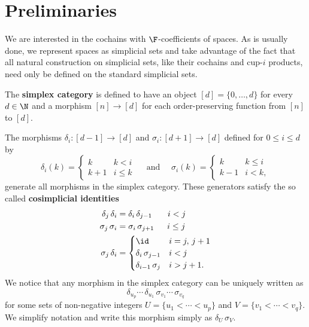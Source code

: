 
\section{Preliminaries}

We are interested in the cochains with $\F$-coefficients of spaces. As is usually done, we represent spaces as simplicial sets and take advantage of the fact that all natural construction on simplicial sets, like their cochains and cup-$i$ products, need only be defined on the standard simplicial sets.

The \textbf{simplex category} is defined to have an object $[d] = \{0, \dots, d\}$ for every $d \in \N$ and a morphism $[n] \to [d]$ for each order-preserving function from $[n]$ to $[d]$.

The morphisms $\delta_i : [d-1] \to [d]$ and $\sigma_i : [d+1] \to [d]$ defined for $0 \leq i \leq d$ by
\begin{equation*}
\delta_i(k) =
\begin{cases} k & k < i \\ k+1 & i \leq k \end{cases}
\quad \text{ and } \quad
\sigma_i(k) =
\begin{cases} k & k \leq i \\ k-1 & i < k, \end{cases}
\end{equation*}
generate all morphisms in the simplex category. These generators satisfy the so called \textbf{cosimplicial identities}
\begin{equation*}
\begin{split}
\delta_j \, \delta_i &= \delta_i \, \delta_{j-1} \hspace*{18.5pt} i < j \\
\sigma_j \, \sigma_i &= \sigma_i \, \sigma_{j+1} \hspace*{15.5pt} i \leq j \\
\sigma_j \, \delta_i &=
\begin{cases}
\id & i = j,\, j+1 \\
\delta_i \, \sigma_{j-1} & i < j \\
\delta_{i-1} \, \sigma_{j} & i > j + 1.
\end{cases}
\end{split}
\end{equation*}
We notice that any morphism in the simplex category can be uniquely written as
\begin{equation*}
\delta_{u_{p}} \cdots\, \delta_{u_1}\, \sigma_{v_1} \cdots\, \sigma_{v_q}
\end{equation*}
for some sets of non-negative integers $U = \{u_1 < \cdots < u_{p}\}$ and $V = \{v_1 < \cdots < v_{q}\}$. We simplify notation and write this morphism simply as $\delta_U\, \sigma_V$.


